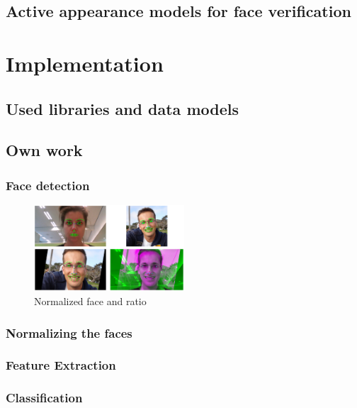 \documentclass[10pt,a4paper,twocolumn]{article}
\begin{document}
\subsection{Active appearance models for face verification}
\label{sec:aam}





\section{Implementation}

\subsection{Used libraries and data models}


\subsection{Own work}

\subsubsection{Face detection}
\begin{figure}[!h]
	\begin{center}
	\includegraphics[width=0.5\textwidth]{./ratio.png}
	\caption{Normalized face and ratio}
	\label{fig:ratio}
	\end{center}
\end{figure}

\subsubsection{Normalizing the faces}


\subsubsection{Feature Extraction}


\subsubsection{Classification}
\end{document}
